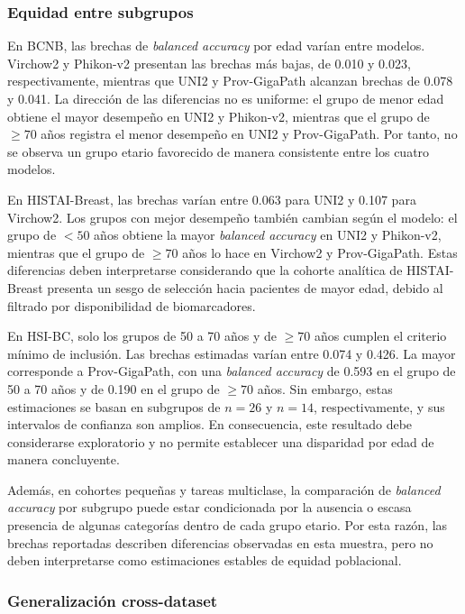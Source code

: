 \subsubsection{Equidad entre subgrupos}

En BCNB, las brechas de \textit{balanced accuracy} por edad varían entre modelos. Virchow2 y Phikon-v2 presentan las brechas más bajas, de 0.010 y 0.023, respectivamente, mientras que UNI2 y Prov-GigaPath alcanzan brechas de 0.078 y 0.041. La dirección de las diferencias no es uniforme: el grupo de menor edad obtiene el mayor desempeño en UNI2 y Phikon-v2, mientras que el grupo de $\geq 70$ años registra el menor desempeño en UNI2 y Prov-GigaPath. Por tanto, no se observa un grupo etario favorecido de manera consistente entre los cuatro modelos.

En HISTAI-Breast, las brechas varían entre 0.063 para UNI2 y 0.107 para Virchow2. Los grupos con mejor desempeño también cambian según el modelo: el grupo de $<50$ años obtiene la mayor \textit{balanced accuracy} en UNI2 y Phikon-v2, mientras que el grupo de $\geq 70$ años lo hace en Virchow2 y Prov-GigaPath. Estas diferencias deben interpretarse considerando que la cohorte analítica de HISTAI-Breast presenta un sesgo de selección hacia pacientes de mayor edad, debido al filtrado por disponibilidad de biomarcadores.

En HSI-BC, solo los grupos de 50 a 70 años y de $\geq 70$ años cumplen el criterio mínimo de inclusión. Las brechas estimadas varían entre 0.074 y 0.426. La mayor corresponde a Prov-GigaPath, con una \textit{balanced accuracy} de 0.593 en el grupo de 50 a 70 años y de 0.190 en el grupo de $\geq 70$ años. Sin embargo, estas estimaciones se basan en subgrupos de $n=26$ y $n=14$, respectivamente, y sus intervalos de confianza son amplios. En consecuencia, este resultado debe considerarse exploratorio y no permite establecer una disparidad por edad de manera concluyente.

Además, en cohortes pequeñas y tareas multiclase, la comparación de \textit{balanced accuracy} por subgrupo puede estar condicionada por la ausencia o escasa presencia de algunas categorías dentro de cada grupo etario. Por esta razón, las brechas reportadas describen diferencias observadas en esta muestra, pero no deben interpretarse como estimaciones estables de equidad poblacional.

\subsubsection{Generalización cross-dataset}

